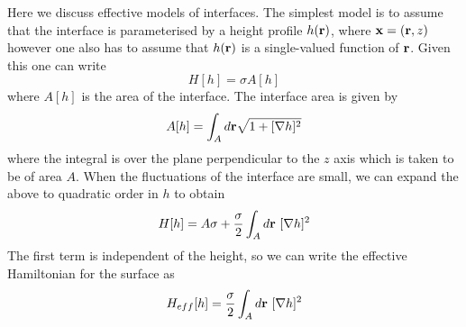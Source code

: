 Here we discuss effective models of interfaces. The simplest model is to assume that the 
interface is parameterised by a height profile $h({\bf r})$, where ${\bf x} = ({\bf r},z)$ however one also has to assume that 
$h({\bf r})$ is a single-valued function of ${\bf r}$. Given this one can write
\begin{equation}
H[h] = \sigma A[h]
\end{equation}
where $A[h]$ is the area of the interface. The interface area is given by
\begin{equation}
A[h] = \int_A d{\bf r}\sqrt{1+[\nabla h]^2}
\end{equation}
where the integral is over the plane perpendicular to the $z$ axis which is taken to be of area $A$. When the fluctuations of the interface are small, we can expand the above to quadratic order in $h$ to obtain
\begin{equation}
H[h]= A\sigma +\frac{\sigma}{2} \int_A d{\bf r} \ [\nabla h]^2
\end{equation}
The first term is independent of the height, so we can write the effective Hamiltonian for the surface as
\begin{equation}
H_{eff} [h]= \frac{\sigma}{2} \int_A d\br\ [\nabla h]^2
\label{heff}
\end{equation}

